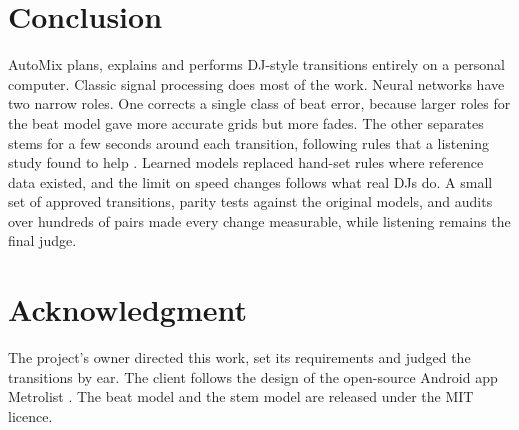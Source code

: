 \documentclass[conference,a4paper]{IEEEtran}
\begin{document}
\section{Conclusion}

AutoMix plans, explains and performs DJ-style transitions entirely on a personal computer. Classic
signal processing does most of the work. Neural networks have two narrow roles. One corrects a
single class of beat error, because larger roles for the beat model gave more accurate grids but
more fades. The other separates stems for a few seconds around each transition, following rules
that a listening study found to help \cite{mosaikbox}. Learned models replaced hand-set rules where
reference data existed, and the limit on speed changes follows what real DJs do. A small set of
approved transitions, parity tests against the original models, and audits over hundreds of pairs
made every change measurable, while listening remains the final judge.

\section*{Acknowledgment}
The project's owner directed this work, set its requirements and judged the transitions by ear.
The client follows the design of the open-source Android app Metrolist \cite{metrolist}. The beat
model \cite{beatthis} and the stem model \cite{htdemucs} are released under the MIT licence.
\end{document}
